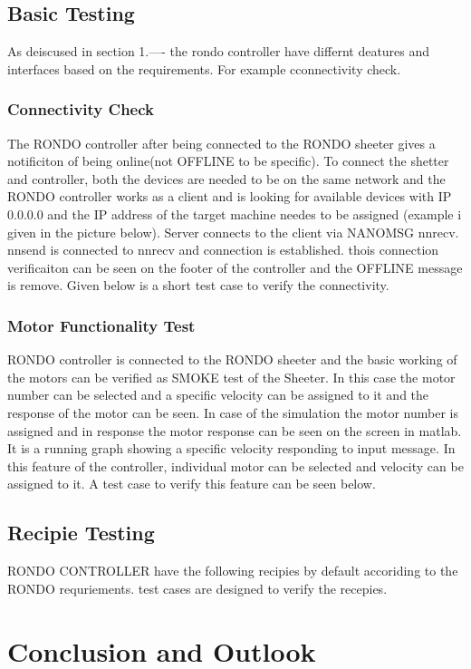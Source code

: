 \documentclass{listhesis}
\begin{document}
\section{Basic Testing}
As deiscused in section 1.---- the rondo controller have differnt deatures and interfaces based on the requirements. For example cconnectivity check.

\subsection{Connectivity Check}
The RONDO controller after being connected to the RONDO sheeter gives a notificiton of being online(not OFFLINE to be specific). To connect the shetter and controller, both the devices are needed to be on the same network and the RONDO controller works as a client and is looking for available devices with IP 0.0.0.0 and the IP address of the target machine needes to be assigned (example i given in the picture below). Server connects to the client via NANOMSG nnrecv. nnsend is connected to nnrecv and connection is established. thois connection verificaiton can be seen on the footer of the controller and the OFFLINE message is remove. Given below is a short test case to verify the connectivity.

\subsection{Motor Functionality Test}
RONDO controller is connected to the RONDO sheeter and the basic working of the motors can be verified as SMOKE test of the Sheeter. In this case the motor number can be selected and a specific velocity can be assigned to it and the response of the motor can be seen. In case of the simulation the motor number is assigned and in response the motor response can be seen on the screen in matlab. It is a running graph showing a specific velocity responding to input message. In this feature of the controller, individual motor can be selected and velocity can be assigned to it. A test case to verify this feature can be seen below. 


\section {Recipie Testing} 
RONDO CONTROLLER have the following recipies by default accoriding to the RONDO requriements. test cases are designed to verify the recepies.



\chapter{Conclusion and Outlook}
\end{document}
